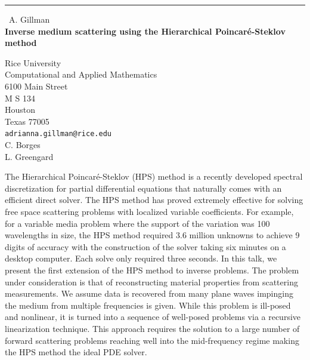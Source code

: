 \documentclass{report}
\begin{document}
\begin{center}
\rule{6in}{1pt} \
{\large A. Gillman \\
{\bf Inverse medium scattering using the Hierarchical Poincar\'e-Steklov method }}

Rice University \\ Computational and Applied Mathematics \\ 6100 Main Street \\ M S 134 \\ Houston \\ Texas 77005
\\
{\tt adrianna.gillman@rice.edu}\\
C. Borges\\
L.  Greengard\end{center}

The Hierarchical Poincar\'e-Steklov (HPS) method is a recently developed
spectral discretization for partial differential equations that
naturally comes with an efficient direct solver. The HPS
method has proved extremely effective for solving free space
scattering problems with localized variable coefficients. For example,
for a variable media problem where the support of the variation was
100 wavelengths in size, the HPS method required 3.6 million unknowns to
achieve 9 digits of accuracy with the construction of the solver taking
six minutes on a desktop computer. Each solve only required three seconds. In this
talk, we present the first extension of the HPS method to inverse problems.
The problem under consideration is that of reconstructing material properties
from scattering measurements. We assume data is recovered from
many plane waves impinging the medium from multiple frequencies is given. While
this problem is ill-posed and nonlinear, it is turned into a sequence of
well-posed problems via a recursive linearization technique.
This approach requires the solution to a large number of forward scattering
problems reaching well into the mid-frequency regime making the HPS method
the ideal PDE solver.
\end{document}
